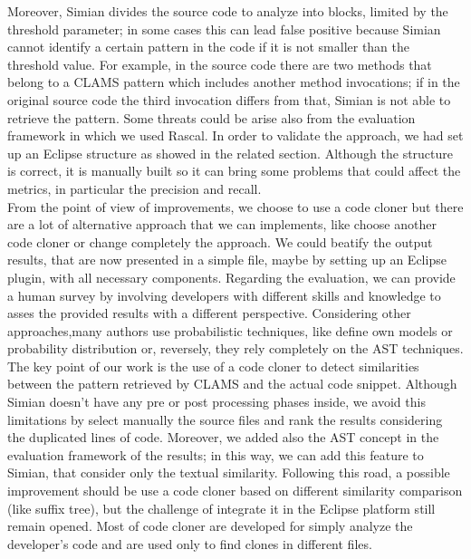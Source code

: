 Moreover, Simian divides the source code to analyze into blocks, limited by the threshold parameter; in some cases this can lead false positive because Simian cannot identify a certain pattern in the code if it is not smaller than the threshold value. For example, in the source code there are two methods that belong to a CLAMS pattern which includes another method invocations; if in the original source code the third invocation differs from that, Simian is not able to retrieve the pattern. 
Some threats could be arise also from the evaluation framework in which we used Rascal. In order to validate the approach, we had set up an Eclipse structure as showed in the related section. Although the structure is correct, it is manually built so it can bring some problems that could affect the metrics, in particular the precision and recall. \\
From the point of view of improvements, we choose to use a code cloner but there are a lot of alternative approach that we can implements, like choose another code cloner or change completely the approach. We could beatify the output results, that are now presented in a simple file, maybe by setting up an Eclipse plugin, with all necessary components. Regarding the evaluation, we can provide a human survey by involving developers with different skills and knowledge to asses the provided results with a different perspective. 
Considering other approaches,many authors use probabilistic techniques, like define own models or probability distribution or, reversely, they rely completely on the AST techniques. The key point of our work is the use of a code cloner to detect similarities between the pattern retrieved by CLAMS and the actual code snippet. Although Simian doesn't have any pre or post processing phases inside, we avoid this limitations by select manually the source files and rank the results considering the duplicated lines of code. Moreover, we added also the AST concept in the evaluation framework of the results; in this way, we can add this feature to Simian, that consider only the textual similarity. Following this road, a possible improvement should be use a code cloner based on different similarity comparison (like suffix tree), but the challenge of integrate it in the Eclipse platform still remain opened. Most of code cloner are developed for simply analyze the developer's code and are used only to find clones in different files.   